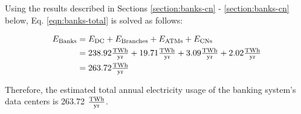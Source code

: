 Using the results described in Sections \ref{section:banks-cn} - \ref{section:banks-cn} below, Eq. \eqref{eqn:banks-total} is solved as follows:

\begin{align}\label{eqn:banks-total-e-res}
  E_\textrm{Banks} &= E_\textrm{DC} + E_\textrm{Branches} + E_\textrm{ATMs} + E_\textrm{CNs} \nonumber \\
                   &= 238.92 \tfrac{ \textrm{{T}Wh} } { \textrm{yr} } + 19.71 \tfrac{ \textrm{{T}Wh} } { \textrm{yr} } + 3.09 \tfrac{ \textrm{{T}Wh} } { \textrm{yr} } + 2.02 \tfrac{ \textrm{{T}Wh} } { \textrm{yr} } \nonumber \\
                   &= 263.72 \tfrac{ \textrm{{T}Wh} } { \textrm{yr} }
\end{align}

Therefore, the estimated total annual electricity usage of the banking system's data centers is 263.72 $\tfrac{ \textrm{{T}Wh} } { \textrm{yr} }$.

